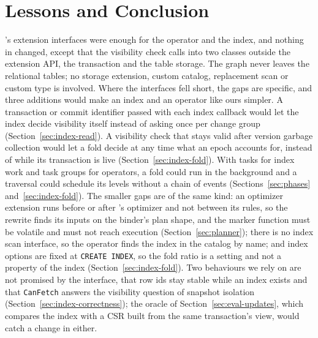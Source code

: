 \section{Lessons and Conclusion}
\label{sec:conclusion}
\label{sec:strategy}
\label{sec:hooks}

\duckdb's extension interfaces were enough for the operator and the index, and nothing in \duckdb changed, except
that the visibility check calls into two classes outside the extension API, the transaction and the table storage. The
graph never leaves the relational tables; no storage extension, custom catalog, replacement scan or custom type is
involved. Where the interfaces fell short, the gaps are specific, and three additions would make an index and an
operator like ours simpler. A transaction or commit identifier passed with each index callback would let the index
decide visibility itself instead of asking \duckdb once per change group (Section~\ref{sec:index-read}). A visibility
check that stays valid after version garbage collection would let a fold decide at any time what an epoch accounts for,
instead of while its transaction is live (Section~\ref{sec:index-fold}). With tasks for index work and task groups for
operators, a fold could run in the background and a traversal could schedule its levels without a chain of events
(Sections~\ref{sec:phases} and~\ref{sec:index-fold}). The smaller gaps are of the same kind: an optimizer extension
runs before or after \duckdb's optimizer and not between its rules, so the rewrite finds its inputs on the binder's
plan shape, and the marker function must be volatile and must not reach execution (Section~\ref{sec:planner}); there
is no index scan interface, so the operator finds the index in the catalog by name; and index options are fixed at
\texttt{CREATE INDEX}, so the fold ratio is a setting and not a property of the index (Section~\ref{sec:index-fold}).
Two behaviours we rely on are not promised by the interface, that row ids stay stable while an index exists and that
\texttt{CanFetch} answers the visibility question of snapshot isolation (Section~\ref{sec:index-correctness}); the oracle of Section~\ref{sec:eval-updates}, which compares the index with a CSR built from the same transaction's view, would catch a change in either.

